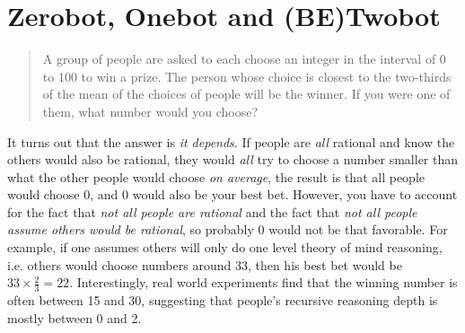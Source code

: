 \documentclass[11pt, oneside]{article}   	%
\begin{document}
\section{Zerobot, Onebot and (BE)Twobot}
\begin{quote}
	A group of people are asked to each choose an integer in the interval of 0 to 100 to win a prize. The person whose choice is closest to the two-thirds of the mean of the choices of people will be the winner. If you were one of them, what number would you choose?
\end{quote}
It turns out that the answer is \emph{it depends}. If people are \emph{all} rational and know the others would also be rational, they would \emph{all} try to choose a number smaller than what the other people would choose \emph{on average}, the result is that all people would choose 0, and 0 would also be your best bet. However, you have to account for the fact that \emph{not all people are rational} and the fact that \emph{not all people assume others would be rational}, so probably 0 would not be that favorable. For example, if one assumes others will only do one level theory of mind reasoning, i.e. others would choose numbers around 33, then his best bet would be $33\times \frac{2}{3} = 22$. Interestingly, real world experiments find that the winning number is often between 15 and 30, suggesting that people's recursive reasoning depth is mostly between 0 and 2.
\end{document}
